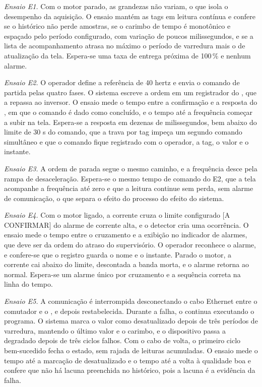 \par \emph{Ensaio E1.} Com o motor parado, as grandezas não variam, o que isola o desempenho da aquisição. O ensaio mantém as tags em leitura contínua e confere se o histórico não perde amostras, se o carimbo de tempo é monotônico e espaçado pelo período configurado, com variação de poucos milissegundos, e se a lista de acompanhamento atrasa no máximo o período de varredura mais o de atualização da tela. Espera-se uma taxa de entrega próxima de 100\,\% e nenhum alarme.

\par \emph{Ensaio E2.} O operador define a referência de 40 hertz e envia o comando de partida pelas quatro fases. O sistema escreve a ordem em um registrador do , que a repassa ao inversor. O ensaio mede o tempo entre a confirmação e a resposta do , em que o comando é dado como concluído, e o tempo até a frequência começar a subir na tela. Espera-se a resposta em dezenas de milissegundos, bem abaixo do limite de 30 s do comando, que a trava por tag impeça um segundo comando simultâneo e que o comando fique registrado com o operador, a tag, o valor e o instante.

\par \emph{Ensaio E3.} A ordem de parada segue o mesmo caminho, e a frequência desce pela rampa de desaceleração. Espera-se o mesmo tempo de comando do E2, que a tela acompanhe a frequência até zero e que a leitura continue sem perda, sem alarme de comunicação, o que separa o efeito do processo do efeito do sistema.

\par \emph{Ensaio E4.} Com o motor ligado, a corrente cruza o limite configurado [A CONFIRMAR] do alarme de corrente alta, e o detector cria uma ocorrência. O ensaio mede o tempo entre o cruzamento e a exibição no indicador de alarmes, que deve ser da ordem do atraso do supervisório. O operador reconhece o alarme, e confere-se que o registro guarda o nome e o instante. Parado o motor, a corrente cai abaixo do limite, descontada a banda morta, e o alarme retorna ao normal. Espera-se um alarme único por cruzamento e a sequência correta na linha do tempo.

\par \emph{Ensaio E5.} A comunicação é interrompida desconectando o cabo Ethernet entre o comutador e o , e depois restabelecida. Durante a falha, o  continua executando o programa. O sistema marca o valor como desatualizado depois de três períodos de varredura, mantendo o último valor e o carimbo, e o dispositivo passa a degradado depois de três ciclos falhos. Com o cabo de volta, o primeiro ciclo bem-sucedido fecha o estado, sem rajada de leituras acumuladas. O ensaio mede o tempo até a marcação de desatualizado e o tempo até a volta à qualidade boa e confere que não há lacuna preenchida no histórico, pois a lacuna é a evidência da falha.

